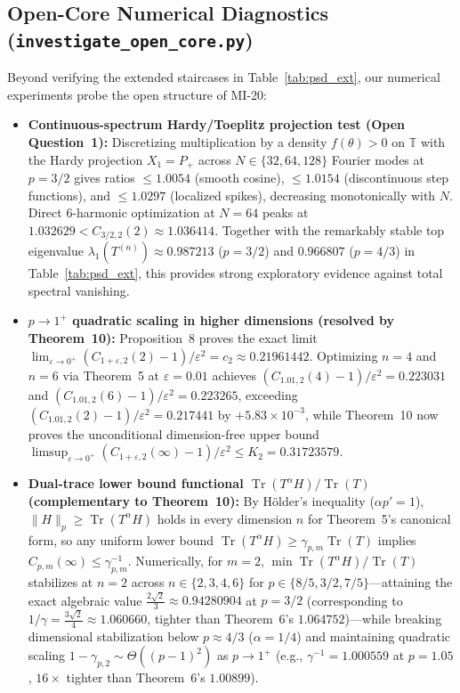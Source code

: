 \documentclass[10pt,letterpaper]{article}
\newcommand{\Tr}{\operatorname{Tr}}
\begin{document}
\subsection{Open-Core Numerical Diagnostics (\texttt{investigate\_open\_core.py})}

Beyond verifying the extended staircases in Table~\ref{tab:psd_ext}, our numerical experiments probe the open structure of MI-20:
\begin{itemize}[leftmargin=1.5em,itemsep=2pt]
  \item \textbf{Continuous-spectrum Hardy/Toeplitz projection test (Open Question~1):} Discretizing multiplication by a density $f(\theta) > 0$ on $\mathbb{T}$ with the Hardy projection $X_1 = P_+$ across $N \in \{32, 64, 128\}$ Fourier modes at $p = 3/2$ gives ratios $\le 1.0054$ (smooth cosine), $\le 1.0154$ (discontinuous step functions), and $\le 1.0297$ (localized spikes), decreasing monotonically with $N$. Direct 6-harmonic optimization at $N = 64$ peaks at $1.032629 < C_{3/2,2}(2) \approx 1.036414$. Together with the remarkably stable top eigenvalue $\lambda_1(T^{(n)}) \approx 0.987213$ ($p = 3/2$) and $0.966807$ ($p = 4/3$) in Table~\ref{tab:psd_ext}, this provides strong exploratory evidence against total spectral vanishing.
  \item \textbf{$p \to 1^+$ quadratic scaling in higher dimensions (resolved by Theorem~10):} Proposition~8 proves the exact limit $\lim_{\varepsilon\to 0^+}(C_{1+\varepsilon,2}(2)-1)/\varepsilon^2 = c_2 \approx 0.21961442$. Optimizing $n = 4$ and $n = 6$ via Theorem~5 at $\varepsilon = 0.01$ achieves $(C_{1.01,2}(4)-1)/\varepsilon^2 = 0.223031$ and $(C_{1.01,2}(6)-1)/\varepsilon^2 = 0.223265$, exceeding $(C_{1.01,2}(2)-1)/\varepsilon^2 = 0.217441$ by $+5.83\times 10^{-3}$, while Theorem~10 now proves the unconditional dimension-free upper bound $\limsup_{\varepsilon\to 0^+}(C_{1+\varepsilon,2}(\infty)-1)/\varepsilon^2 \le K_2 = 0.31723579$.
  \item \textbf{Dual-trace lower bound functional $\Tr(T^\alpha H) / \Tr(T)$ (complementary to Theorem~10):} By H\"older's inequality ($\alpha p' = 1$), $\|H\|_p \ge \Tr(T^\alpha H)$ holds in every dimension $n$ for Theorem~5's canonical form, so any uniform lower bound $\Tr(T^\alpha H) \ge \gamma_{p,m}\Tr(T)$ implies $C_{p,m}(\infty) \le \gamma_{p,m}^{-1}$. Numerically, for $m = 2$, $\min \Tr(T^\alpha H)/\Tr(T)$ stabilizes at $n = 2$ across $n \in \{2, 3, 4, 6\}$ for $p \in \{8/5, 3/2, 7/5\}$—attaining the exact algebraic value $\frac{2\sqrt{2}}{3} \approx 0.94280904$ at $p = 3/2$ (corresponding to $1/\gamma = \frac{3\sqrt{2}}{4} \approx 1.060660$, tighter than Theorem~6's $1.064752$)—while breaking dimensional stabilization below $p \approx 4/3$ ($\alpha = 1/4$) and maintaining quadratic scaling $1 - \gamma_{p,2} \sim \Theta((p-1)^2)$ as $p \to 1^+$ (e.g., $\gamma^{-1} = 1.000559$ at $p = 1.05$, $16\times$ tighter than Theorem~6's $1.00899$).
\end{itemize}
\end{document}
